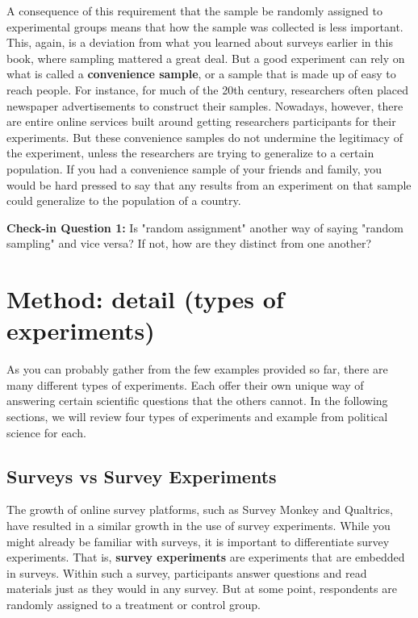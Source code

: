 \documentclass{book}
\newenvironment{shaded*}{
    \begin{center}
    \begin{tabular}{|p{0.9\textwidth}|}
    \hline\\
    }
    { 
    \\\\\hline
    \end{tabular} 
    \end{center}
}
\begin{document}
A consequence of this requirement that the sample be randomly assigned to
experimental groups means that how the sample was collected is less important.
This, again, is a deviation from what you learned about surveys earlier in
this book, where sampling mattered a great deal. But a good experiment can
rely on what is called a \textbf{convenience sample}, or a sample that is made
up of easy to reach people. For instance, for much of the 20th century,
researchers often placed newspaper advertisements to construct their samples.
Nowadays, however, there are entire online services built around getting
researchers participants for their experiments. But these convenience samples
do not undermine the legitimacy of the experiment, unless the researchers are
trying to generalize to a certain population. If you had a convenience sample
of your friends and family, you would be hard pressed to say that any results
from an experiment on that sample could generalize to the population of a
country.

\begin{shaded*}

\textbf{Check-in Question 1:} Is "random assignment" another way of saying
"random sampling" and vice versa? If not, how are they distinct from one
another?

\end{shaded*}

\hypertarget{method-detail-types-of-experiments}{%
\section{Method: detail (types of
experiments)}\label{method-detail-types-of-experiments}}

As you can probably gather from the few examples provided so far, there are
many different types of experiments. Each offer their own unique way of
answering certain scientific questions that the others cannot. In the
following sections, we will review four types of experiments and example from
political science for each.

\hypertarget{surveys-vs-survey-experiments}{%
\subsection{Surveys vs Survey
Experiments}\label{surveys-vs-survey-experiments}}

The growth of online survey platforms, such as Survey Monkey and Qualtrics,
have resulted in a similar growth in the use of survey experiments. While you
might already be familiar with surveys, it is important to differentiate
survey experiments. That is, \textbf{survey experiments} are experiments that
are embedded in surveys. Within such a survey, participants answer questions
and read materials just as they would in any survey. But at some point,
respondents are randomly assigned to a treatment or control group.
\end{document}
